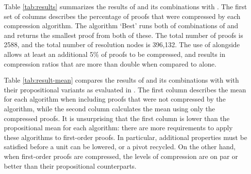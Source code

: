 {Table \ref{tab:results} summarizes the results of {\FORPI} and its combinations with {\GFOLU}. The first set of columns describes the percentage of proofs that were compressed by each compression algorithm. The algorithm `Best' runs both of combinations of {\GFOLU} and {\FORPI} and returns the smallest proof from both of these. The total number of proofs is 2588, and the total number of resolution nodes is 396,132. The use of {\FORPI} alongside {\GFOLU} allows at least an additional 5\% of proofs to be compressed, and results in compression ratios that are more than double when compared to {\GFOLU} alone.

Table \ref{tab:result-mean} compares the results of {\FORPI} and its combinations with {\GFOLU} with their propositional variants as evaluated in  \cite{Boudou}. The first column describes the mean for each algorithm when including proofs that were not compressed by the algorithm, while the second column calculates the mean using only the compressed proofs. It is unsurprising that the first column is lower than the propositional mean for each algorithm: there are more requirements to apply these algorithms to first-order proofs. In particular, additional properties must be satisfied before a unit can be lowered, or a pivot recycled. On the other hand, when first-order proofs are compressed, the levels of compression are on par or better than their propositional counterparts.

\begin{figure}[p]
    

\end{figure}}
